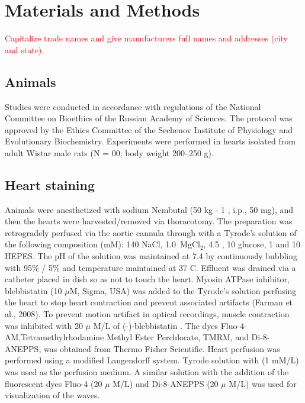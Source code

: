 \documentclass{biophys-new}
\begin{document}
\section*{Materials and Methods}

\textcolor{red}{Capitalize trade names and give manufacturers full names and addresses (city and state).}

\subsection*{Animals}

Studies were conducted in accordance with regulations of the National Committee on Bioethics of the Russian Academy of Sciences.
The protocol was approved by the Ethics Committee of the Sechenov Institute of Physiology and Evolutionary Biochemistry.
Experiments were performed in hearts isolated from adult Wistar male rats (N = 00; body weight 200–250 g).

\subsection*{Heart staining}

Animals were anesthetized with sodium Nembutal (50 kg - 1 , i.p., 50 mg), and then the hearts were harvested/removed via thoracotomy.
The preparation was retrogradely perfused via the aortic cannula through with a Tyrode’s solution of the following composition (mM): 140 NaCl, 1.0 \(\,\mathrm{Mg}\mathrm{Cl}_2\), 4.5 , 10 glucose, 1  and 10 HEPES.
The pH of the solution was maintained at 7.4 by continuously bubbling with 95\% / 5\%  and temperature maintained at 37 C\degree.
Effluent was drained via a catheter placed in dish so as not to touch the heart.
Myosin ATPase inhibitor, blebbistatin (10 $\mu$M, Sigma, USA) was added to the Tyrode’s solution perfusing the heart to stop heart contraction and prevent associated artifacts (Farman et al., 2008).
To prevent motion artifact in optical recordings, muscle contraction was inhibited with 20 $\mu$ M/L of (-)-blebbistatin \cite{kong2014role}.
The dyes Fluo-4-AM,Tetramethylrhodamine Methyl Ester Perchlorate, TMRM, and Di-8-ANEPPS, was obtained from Thermo Fisher Scientific.
Heart perfusion was performed using a modified Langendorff system. Tyrode solution with  (1 mM/L) was used as the perfusion medium.
A similar solution with the addition of the fluorescent dyes Fluo-4 (20 $\mu$ M/L) and Di-8-ANEPPS (20 $\mu$ M/L) was used for visualization of the  waves.
\end{document}
